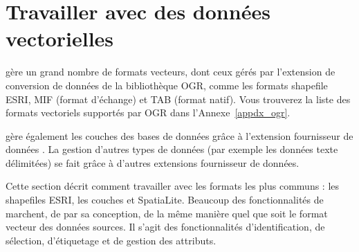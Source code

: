 
\chapter{Travailler avec des données vectorielles}\label{label_workingvector}

\qg gère un grand nombre de formats vecteurs, dont ceux gérés par l'extension de conversion de données de la bibliothèque OGR, comme les formats shapefile ESRI, \map MIF (format d'échange) et  \map TAB (format natif).
Vous trouverez la liste des formats vectoriels supportés par OGR dans l'Annexe~\ref{appdx_ogr}.

\qg gère également les couches \pg {} des bases de données \psq grâce à l'extension fournisseur de données \psq. La gestion d'autres types de données (par exemple les données texte délimitées) se fait grâce à d'autres extensions fournisseur de données.

Cette section décrit comment travailler avec les formats les plus communs : les shapefiles ESRI, les couches \pg et SpatiaLite. Beaucoup des fonctionnalités de \qg marchent, de par sa conception, de la même manière quel que soit le format vecteur des données sources. Il s'agit des fonctionnalités d'identification, de sélection, d'étiquetage et de gestion des attributs.

